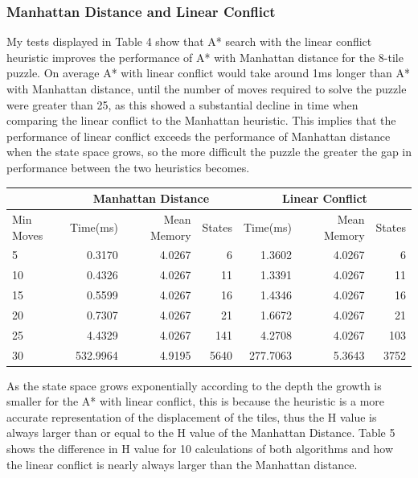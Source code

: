 \documentclass[final]{cmpreport}
\begin{document}
\subsubsection{Manhattan Distance and Linear Conflict}
My tests displayed in Table 4 show that A* search with the linear conflict heuristic improves the performance of A* with Manhattan distance for the 8-tile puzzle. On average A* with linear conflict would take around 1ms longer than A* with Manhattan distance, until the number of moves required to solve the puzzle were greater than 25, as this showed a substantial decline in time when comparing the linear conflict to the Manhattan heuristic. This implies that the performance of linear conflict exceeds the performance of Manhattan distance when the state space grows, so the more difficult the puzzle the greater the gap in performance between the two heuristics becomes.
\begin{center}
	\begin{tabular}{|l|r|r|r|r|r|r|} \cline{2-7}
		
		\multicolumn{1}{c}{} & \multicolumn{3}{|c|}{Manhattan Distance} &
		\multicolumn{3}{|c|}{Linear Conflict} \\ \hline
		Min Moves & Time(ms) & Mean Memory & States & Time(ms) & Mean Memory & States \\	\hline \hline
		5 & 0.3170 & 4.0267 & 6               & 1.3602 & 4.0267 & 6 \\
		10 & 0.4326 & 4.0267 & 11             & 1.3391 & 4.0267 & 11 \\
		15 & 0.5599 & 4.0267 & 16             & 1.4346 & 4.0267 & 16 \\
		20 & 0.7307 & 4.0267 & 21             & 1.6672 & 4.0267 & 21 \\
		25 & 4.4329 & 4.0267 & 141            & 4.2708 & 4.0267 & 103\\
		30 & 532.9964 & 4.9195 & 5640         & 277.7063& 5.3643 &3752\\
		\hline
	
	\end{tabular}

\end{center}
 As the state space grows exponentially according to the depth the growth is smaller for the A* with linear conflict, this is because the heuristic is a more accurate representation of the displacement of the tiles, thus the H value is always larger than or equal to the H value of the Manhattan Distance. Table 5 shows the difference in H value for 10 calculations of both algorithms and how the linear conflict is nearly always larger than the Manhattan distance.
 
\end{document}
